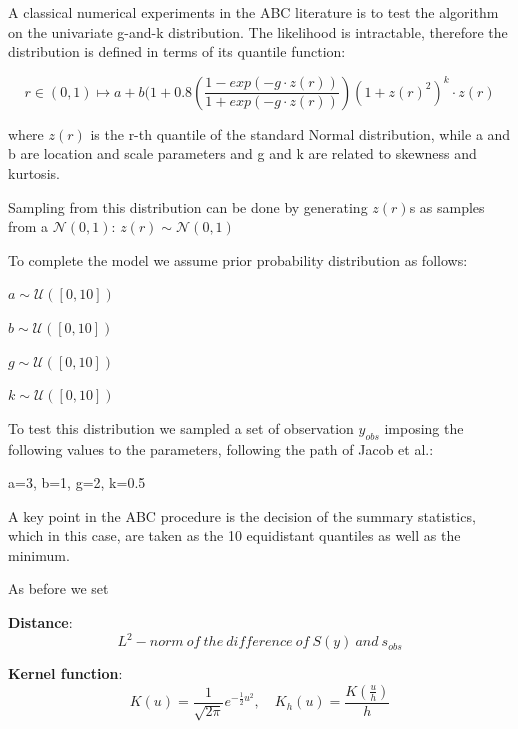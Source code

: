 \documentclass {article}
\begin{document}
A classical numerical experiments in the ABC literature is to test the algorithm on the univariate g-and-k distribution.
The likelihood is intractable, therefore the distribution is defined in terms of its quantile function:

\begin{center}
	
	$$ r \in (0,1) \longmapsto   a + b (1+0.8\left(\frac{1-exp(-g \cdot z(r))}{1+exp(-g\cdot z(r))}\right)(1+ z(r)^{2})^k\cdot z(r)  $$
\end{center}



where $z(r)$ is the r-th quantile of the standard Normal distribution,
while a and b are location and scale parameters and g and k are related to skewness and kurtosis.


Sampling from this distribution can be done by generating $z(r)$s as samples from a $\mathcal{N}(0,1)$: 
$z(r) \sim \mathcal{N}(0,1)$

To complete the model we assume prior probability distribution as follows:
\begin{center}
	$ a \sim \mathcal{U}([0,10])$
	
	$ b \sim \mathcal{U}([0,10])$
	
	$ g \sim \mathcal{U}([0,10])$
	
	$ k \sim \mathcal{U}([0,10])$
\end{center}


To test this distribution we sampled a set of observation $y_{obs}$ imposing the following values to the parameters, following the path of Jacob et al.:

a=3, b=1, g=2, k=0.5

A key point in the ABC procedure is the decision of the summary statistics, which in this case, are taken as the 10 equidistant quantiles as well as the minimum.

As before we set 

\textbf{Distance}: 
$$L^2-norm\ of\ the\ difference\ of\ S(y)\ and\ s_{obs}$$

\textbf{Kernel function}: 
$$
K(u) = 
\frac{1}{\sqrt{2\pi}} e^{-\frac{1}{2}u^2}, 
\quad K_h(u) 
= \frac{K(\frac u h)}{h}
$$
\end{document}
